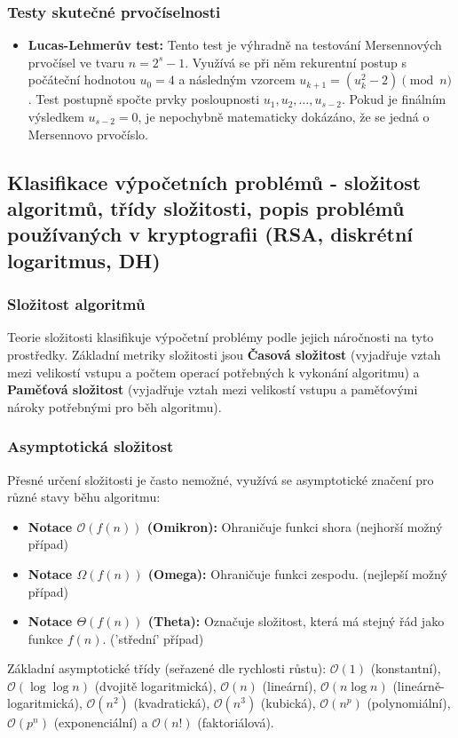             \subsubsection*{Testy skutečné prvočíselnosti}
                \begin{itemize}
                    \item \textbf{Lucas-Lehmerův test:} Tento test je výhradně na testování Mersennových prvočísel ve tvaru $n = 2^s - 1$. Využívá se při něm rekurentní postup s počáteční hodnotou $u_0 = 4$ a následným vzorcem $u_{k+1} = (u_k^2 - 2) \pmod{n}$. Test postupně spočte prvky posloupnosti $u_1, u_2, \dots, u_{s-2}$. Pokud je finálním výsledkem $u_{s-2} = 0$, je nepochybně matematicky dokázáno, že se jedná o Mersennovo prvočíslo.
                \end{itemize}
                
        \subsection{Klasifikace výpočetních problémů - složitost algoritmů, třídy složitosti, popis problémů používaných v kryptografii (RSA, diskrétní logaritmus, DH)}
            \subsubsection{Složitost algoritmů}
                Teorie složitosti klasifikuje výpočetní problémy podle jejich náročnosti na tyto prostředky. Základní metriky složitosti jsou \textbf{Časová složitost} (vyjadřuje vztah mezi velikostí vstupu a počtem operací potřebných k vykonání algoritmu) a \textbf{Paměťová složitost} (vyjadřuje vztah mezi velikostí vstupu a paměťovými nároky potřebnými pro běh algoritmu).
                \subsubsection*{Asymptotická složitost}
                Přesné určení složitosti je často nemožné, využívá se asymptotické značení pro různé stavy běhu algoritmu:
                \begin{itemize}
                    \item \textbf{Notace $\mathcal{O}(f(n))$ (Omikron):} Ohraničuje funkci shora (nejhorší možný případ)
                    \item \textbf{Notace $\Omega(f(n))$ (Omega):} Ohraničuje funkci zespodu. (nejlepší možný případ)
                    \item \textbf{Notace $\Theta(f(n))$ (Theta):} Označuje složitost, která má stejný řád jako funkce $f(n)$. ('střední' případ)
                \end{itemize}
                Základní asymptotické třídy (seřazené dle rychlosti růstu): $\mathcal{O}(1)$ (konstantní), $\mathcal{O}(\log \log n)$ (dvojitě logaritmická), $\mathcal{O}(n)$ (lineární), $\mathcal{O}(n \log n)$ (lineárně-logaritmická), $\mathcal{O}(n^2)$ (kvadratická), $\mathcal{O}(n^3)$ (kubická), $\mathcal{O}(n^p)$ (polynomiální), $\mathcal{O}(p^n)$ (exponenciální) a $\mathcal{O}(n!)$ (faktoriálová).

